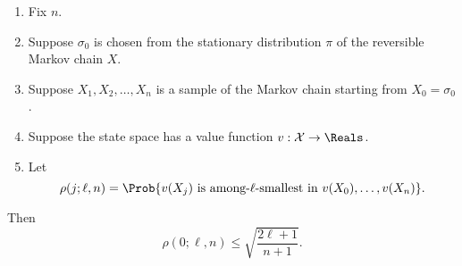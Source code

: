 \documentclass[12pt]{article}
\begin{document}
\begin{proposition}
    \label{thm:serialsignificance:basethm}
    \begin{enumerate}
        \item
            Fix \( n \).
        \item
            Suppose \( \sigma_0 \) is chosen from the stationary
            distribution \( \pi \) of the reversible Markov chain \( X \).
        \item
            Suppose \( X_1, X_2, \dots, X_n \) is a sample of the Markov
            chain starting from \( X_0 = \sigma_0 \).
        \item
            Suppose the state space has a value function \( v : \mathcal
            {X} \to \Reals \).
        \item
            Let
            \[
                \rho(j; \ell, n) = \Prob{v(X_j) \text{ is among-\( \ell \)-smallest
                in } v(X_0), \dots, v(X_n) }.
            \]
    \end{enumerate}

    Then
    \[
        \rho(0; \ell, n) \le \sqrt{ \frac{2\ell + 1}{n+1}}.
    \]
\end{proposition}
\end{document}
